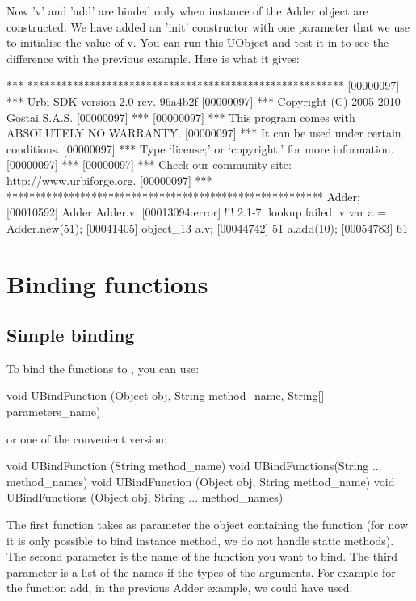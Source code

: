 Now 'v' and 'add' are binded only when instance of the Adder object are
constructed. We have added an 'init' constructor with one parameter that
we use to initialise the value of v. You can run this UObject and test
it in \urbi to see the difference with the previous example. Here is what
it gives:

\begin{cxx}
[00000097] *** ********************************************************
[00000097] *** Urbi SDK version 2.0 rev. 96a4b2f
[00000097] *** Copyright (C) 2005-2010 Gostai S.A.S.
[00000097] ***
[00000097] *** This program comes with ABSOLUTELY NO WARRANTY.
[00000097] *** It can be used under certain conditions.
[00000097] *** Type `license;' or `copyright;' for more information.
[00000097] ***
[00000097] *** Check our community site: http://www.urbiforge.org.
[00000097] *** ********************************************************
Adder;
[00010592] Adder
Adder.v;
[00013094:error] !!! 2.1-7: lookup failed: v
var a = Adder.new(51);
[00041405] object_13
a.v;
[00044742] 51
a.add(10);
[00054783] 61
\end{cxx}


\section{Binding functions}
\label{sec:uob:apijava:func}

\subsection{Simple binding}

To bind the functions to \urbi, you can use:
\begin{cxx}
void UBindFunction (Object obj, String method_name, String[] parameters_name)
\end{cxx}
or one of the convenient version:
\begin{cxx}
void UBindFunction (String method_name)
void UBindFunctions(String ... method_names)
void UBindFunction (Object obj, String method_name)
void UBindFunctions (Object obj, String ... method_names)
\end{cxx}

The first function takes as parameter the object containing the function
(for now it is only possible to bind instance method, we do not handle static
methods). The second parameter is the name of the function you want to bind.
The third parameter is a list of the names if the types of the arguments.
For example for the function add, in the previous Adder example, we could have
used:

